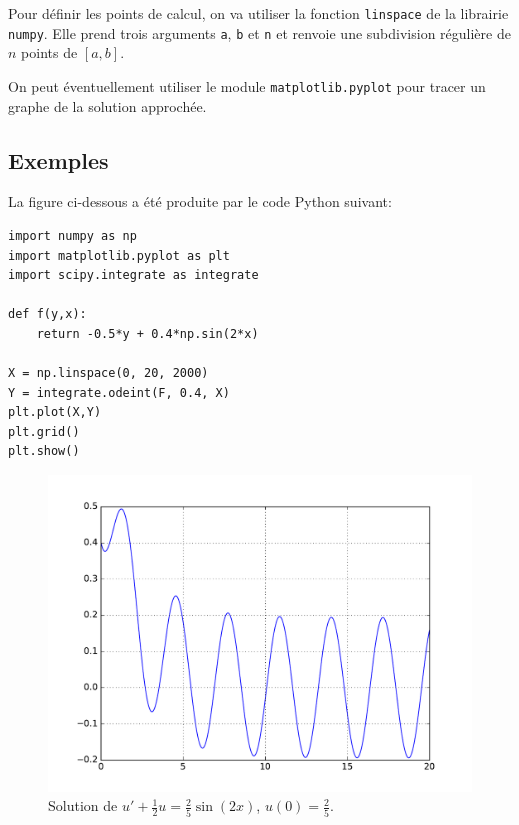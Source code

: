 \documentclass[../main.tex]{subfiles}
\begin{document}
Pour définir les points de calcul, on va utiliser la fonction \texttt{linspace} de la librairie \texttt{numpy}. Elle prend trois arguments \texttt{a}, \texttt{b} et \texttt{n} et renvoie une subdivision régulière de $n$ points de $[a,b]$.

On peut éventuellement utiliser le module \texttt{matplotlib.pyplot} pour tracer un graphe de la solution approchée.

\subsection{Exemples}

\begin{exe}
La figure ci-dessous a été produite par le code \textsf{Python} suivant:
\begin{verbatim}
import numpy as np
import matplotlib.pyplot as plt
import scipy.integrate as integrate

def f(y,x):
    return -0.5*y + 0.4*np.sin(2*x)

X = np.linspace(0, 20, 2000)
Y = integrate.odeint(F, 0.4, X)
plt.plot(X,Y)
plt.grid()
plt.show()
\end{verbatim}

\begin{figure}[H]
	\includegraphics[width=\textwidth]{figures/figure_1.pdf}
	\caption{Solution de $u'+\frac{1}{2}u = \frac{2}{5}\sin(2x)$, $u(0)=\frac{2}{5}$.}
	\label{numIntEx1}
\end{figure}


\end{exe}
\end{document}
